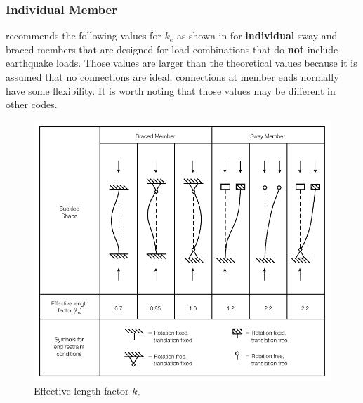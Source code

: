 \subsubsection{Individual Member}
 recommends the following values for $k_e$ as shown in  for \textbf{individual} sway and braced members that are designed for load combinations that do \textbf{not} include earthquake loads. Those values are larger than the theoretical values because it is assumed that no connections are ideal, connections at member ends normally have some flexibility. It is worth noting that those values may be different in other codes.
\begin{figure}[H]\centering
\includegraphics{PIC/CH04/BS}
\caption{Effective length factor $k_e$}\label{fig:k_e}
\end{figure}

